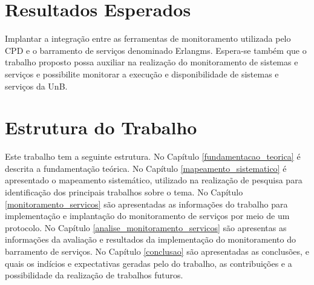 
\section{Resultados Esperados}

Implantar a integração entre as ferramentas de monitoramento utilizada pelo \acrshort{CPD} e o barramento de serviços denominado Erlangms\cite{Agilar}. Espera-se também que o trabalho proposto possa auxiliar na realização do monitoramento de sistemas e serviços e possibilite monitorar a execução e disponibilidade de sistemas e serviços da \acrshort{UnB}.


\section{Estrutura do Trabalho}

Este trabalho tem a seguinte estrutura. No Capítulo \ref{fundamentacao_teorica} é descrita a fundamentação teórica. No Capítulo \ref{mapeamento_sistematico} é apresentado o mapeamento sistemático, utilizado na realização de pesquisa para identificação dos principais trabalhos sobre o tema. No Capítulo \ref{monitoramento_servicos} são apresentadas as informações do trabalho para implementação e implantação do monitoramento de serviços por meio de um protocolo. No Capítulo \ref{analise_monitoramento_servicos} são apresentas as informações da avaliação e resultados da implementação do monitoramento do barramento de serviços. No Capítulo \ref{conclusao} são apresentadas as conclusões, e quais os indícios e expectativas geradas pelo do trabalho, as contribuições e a possibilidade da realização de trabalhos futuros.